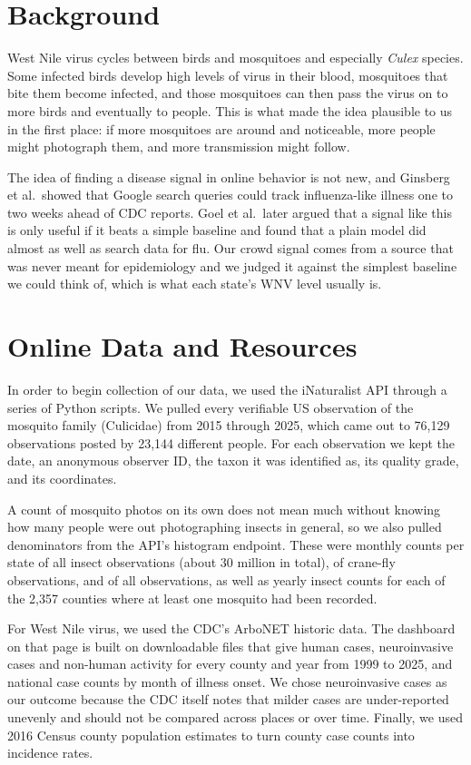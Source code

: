 \documentclass[11pt]{article}
\begin{document}
\section{Background}
West Nile virus cycles between birds and mosquitoes and especially \textit{Culex} species. Some infected birds develop high levels of virus in their blood, mosquitoes that bite them become infected, and those mosquitoes can then pass the virus on to more birds and eventually to people.\cite{cdc_causes} This is what made the idea plausible to us in the first place: if more mosquitoes are around and noticeable, more people might photograph them, and more transmission might follow.

The idea of finding a disease signal in online behavior is not new, and Ginsberg et al.\ showed that Google search queries could track influenza-like illness one to two weeks ahead of CDC reports.\cite{ginsberg2009} Goel et al.\ later argued that a signal like this is only useful if it beats a simple baseline and found that a plain model did almost as well as search data for flu.\cite{goel2010} Our crowd signal comes from a source that was never meant for epidemiology and we judged it against the simplest baseline we could think of, which is what each state's WNV level usually is.

\section{Online Data and Resources}
In order to begin collection of our data, we used the iNaturalist API\cite{inat_api} through a series of Python scripts. We pulled every verifiable US observation of the mosquito family (Culicidae) from 2015 through 2025, which came out to 76,129 observations posted by 23,144 different people. For each observation we kept the date, an anonymous observer ID, the taxon it was identified as, its quality grade, and its coordinates.

A count of mosquito photos on its own does not mean much without knowing how many people were out photographing insects in general, so we also pulled denominators from the API's histogram endpoint. These were monthly counts per state of all insect observations (about 30 million in total), of crane-fly observations, and of all observations, as well as yearly insect counts for each of the 2,357 counties where at least one mosquito had been recorded.

For West Nile virus, we used the CDC's ArboNET historic data.\cite{cdc_historic} The dashboard on that page is built on downloadable files that give human cases, neuroinvasive cases and non-human activity for every county and year from 1999 to 2025, and national case counts by month of illness onset. We chose neuroinvasive cases as our outcome because the CDC itself notes that milder cases are under-reported unevenly and should not be compared across places or over time.\cite{cdc_historic} Finally, we used 2016 Census county population estimates\cite{plotly_county} to turn county case counts into incidence rates.
\end{document}
